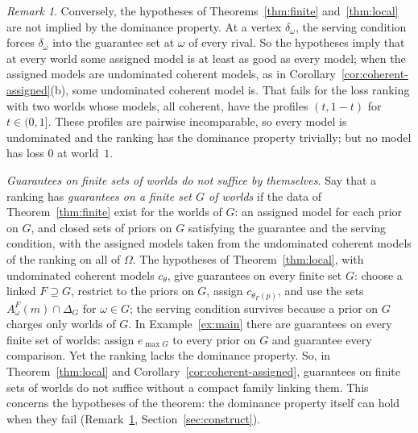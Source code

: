 \documentclass[11pt]{article}
\theoremstyle{definition}
\theoremstyle{remark}
\newtheorem{remark}[theorem]{Remark}
\begin{document}
\begin{remark}\label{rem:vertex}
Conversely, the hypotheses of Theorems~\ref{thm:finite} and~\ref{thm:local} are not implied by the dominance property. At a vertex $\delta_\omega$, the serving condition forces $\delta_\omega$ into the guarantee set at $\omega$ of every rival. So the hypotheses imply that at every world some assigned model is at least as good as every model; when the assigned models are undominated coherent models, as in Corollary~\ref{cor:coherent-assigned}(b), some undominated coherent model is. That fails for the loss ranking with two worlds whose models, all coherent, have the profiles $(t,1-t)$ for $t\in(0,1]$. These profiles are pairwise incomparable, so every model is undominated and the ranking has the dominance property trivially; but no model has loss $0$ at world~$1$.
\end{remark}

\emph{Guarantees on finite sets of worlds do not suffice by themselves.} Say that a ranking has \emph{guarantees on a finite set $G$ of worlds} if the data of Theorem~\ref{thm:finite} exist for the worlds of $G$: an assigned model for each prior on $G$, and closed sets of priors on $G$ satisfying the guarantee and the serving condition, with the assigned models taken from the undominated coherent models of the ranking on all of $\Omega$. The hypotheses of Theorem~\ref{thm:local}, with undominated coherent models $c_\theta$, give guarantees on every finite set $G$: choose a linked $F\supseteq G$, restrict to the priors on $G$, assign $c_{\theta_F(p)}$, and use the sets $A^F_\omega(m)\cap\Delta_G$ for $\omega\in G$; the serving condition survives because a prior on $G$ charges only worlds of $G$. In Example~\ref{ex:main} there are guarantees on every finite set of worlds: assign $e_{\max G}$ to every prior on $G$ and guarantee every comparison. Yet the ranking lacks the dominance property. So, in Theorem~\ref{thm:local} and Corollary~\ref{cor:coherent-assigned}, guarantees on finite sets of worlds do not suffice without a compact family linking them. This concerns the hypotheses of the theorem: the dominance property itself can hold when they fail (Remark~\ref{rem:vertex}, Section~\ref{sec:construct}).
\end{document}
